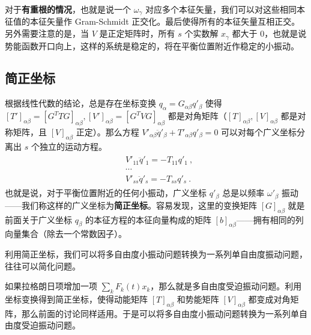 对于\textbf{有重根的情况}，也就是说一个 $\omega_\gamma$ 对应多个本征矢量，我们可以对这些相同本征值的本征矢量作 Gram-Schmidt 正交化。最后使得所有的本征矢量互相正交。另外需要注意的是，当 $V$ 是正定矩阵时，所有 $s$ 个实数解 $x_\gamma$ 都大于 $0$，也就是说势能函数开口向上，这样的系统是稳定的，将在平衡位置附近作稳定的小振动。

\subsection{简正坐标}

根据线性代数的结论，总是存在坐标变换 $q_\alpha=G_{\alpha\beta}q'_\beta$ 使得 $[T']_{\alpha\beta}=[G^T T G]_{\alpha\beta},[V']_{\alpha\beta}=[G^T V G]_{\alpha\beta} $ 都是对角矩阵（$[T]_{\alpha\beta},[V]_{\alpha\beta}$ 都是对称矩阵，且 $[V]_{\alpha\beta}$ 正定）。那么方程 $V'_{\alpha\beta}\ddot{q}'_\beta+T'_{\alpha\beta}q'_\beta=0$ 可以对每个广义坐标分离出 $s$ 个独立的运动方程。
\begin{align}
\begin{matrix}
&V'_{11}\ddot{q}'_1=-T_{11}q'_1~,\\
&\cdots\\
&V'_{ss}\ddot{q}'_s=-T_{ss}q'_s~.
\end{matrix}
\end{align}
也就是说，对于平衡位置附近的任何小振动，广义坐标 $q'_\beta$ 总是以频率 $\omega'_\beta$ 振动——我们称这样的广义坐标为\textbf{简正坐标}。容易发现，这里的变换矩阵 $[G]_{\alpha\beta}$ 就是前面关于广义坐标 $q_\beta$ 的本征方程的本征向量构成的矩阵 $[b]_{\alpha\beta}$——拥有相同的列向量集合（除去一个常数因子）。

利用简正坐标，我们可以将多自由度小振动问题转换为一系列单自由度振动问题，往往可以简化问题。

如果拉格朗日项增加一项 $\sum_k F_k(t)x_k$，那么就是多自由度受迫振动问题。利用坐标变换得到简正坐标，使得动能矩阵 $[T]_{\alpha\beta}$ 和势能矩阵 $[V]_{\alpha\beta}$ 都变成对角矩阵，那么前面的讨论同样适用。于是可以将多自由度小振动问题转换为一系列单自由度受迫振动问题。
